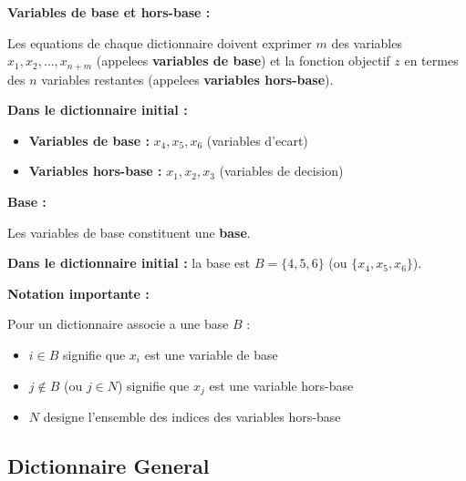 \documentclass[12pt,a4paper]{article}
\begin{document}
\begin{definition}
\textbf{Variables de base et hors-base :}

Les equations de chaque dictionnaire doivent exprimer $m$ des variables $x_1, x_2, \ldots, x_{n+m}$ (appelees \textcolor{titrebleu}{\textbf{variables de base}}) et la fonction objectif $z$ en termes des $n$ variables restantes (appelees \textcolor{defvert}{\textbf{variables hors-base}}).

\textbf{Dans le dictionnaire initial :}
\begin{itemize}
    \item \textcolor{titrebleu}{\textbf{Variables de base :}} $x_4, x_5, x_6$ (variables d'ecart)
    \item \textcolor{defvert}{\textbf{Variables hors-base :}} $x_1, x_2, x_3$ (variables de decision)
\end{itemize}
\end{definition}

\begin{definition}
\textbf{Base :}

Les variables de base constituent une \textcolor{algoviolet}{\textbf{base}}.

\textbf{Dans le dictionnaire initial :} la base est $B = \{4, 5, 6\}$ (ou $\{x_4, x_5, x_6\}$).
\end{definition}

\begin{notecours}
\textbf{Notation importante :}

Pour un dictionnaire associe a une base $B$ :
\begin{itemize}
    \item $i \in B$ signifie que $x_i$ est une variable de base
    \item $j \notin B$ (ou $j \in N$) signifie que $x_j$ est une variable hors-base
    \item $N$ designe l'ensemble des indices des variables hors-base
\end{itemize}
\end{notecours}

\newpage
\subsection{Dictionnaire General}
\end{document}
